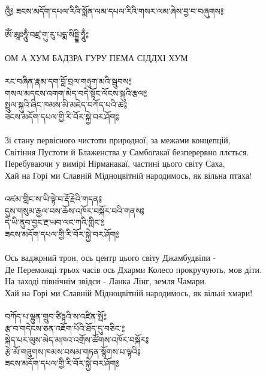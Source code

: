 \ru
\newpage
\ru
{}\\

{\ti འུྃ༔ ཟངས་མདོག་དཔལ་རིའི་སྨོན་ལམ་དཔལ་རིའི་གསར་ལམ་ཞེས་བྱ་བ་བཞུགས༔}\\
\\
{\ti ཨོཾ་ཨཱཿཧཱུྃ་བཛྲ་གུ་རུ་པདྨ་སིདྡྷི་ཧཱུྃ༔}\\
\\
ОМ А ХУМ БАДЗРА ГУРУ ПЕМА СІДДХІ ХУМ \\
\\
{\ti རང་བཞིན་རྣམ་དག་བློ་བྲལ་གཉུག་མའི་སྦུབས༔\\
གསལ་མདངས་འགག་མེད་བདེ་སྟོང་ལོངས་སྐུའི་རྩལ༔\\
སྤྲུལ་སྐུའི་ཞིང་ཁམས་མི་མཇེད་བཀོད་པའི་ཆ༔\\
ཟངས་མདོག་དཔལ་གྱི་རི་བོར་སྐྱེ་བར་ཤོག༔}\\
\\
Зі стану первісного чистоти природної, за межами концепцій,\\
Світіння Пустоти й Блаженства у Самбогакаї безперервно ллється.\\
Перебуваючи у вимірі Нірманакаї, частині цього світу Саха,\\
Хай на Горі ми Славній Мідноцвітній народимось, як вільна птаха!\\
\\
{\ti འཛམ་གླིང་ས་ཡི་ལྟེ་བ་རྡོ་རྗེའི་གདན༔\\
དུས་གསུམ་རྒྱལ་བས་ཆོས་འཁོར་བསྐོར་བའི་གནས༔\\
དེ་ཡི་ནུབ་བྱང་རྔ་ཡབ་ལང་ཀའི་གླིང་༔\\
ཟངས་མདོག་དཔལ་གྱི་རི་བོར་སྐྱེ་བར་ཤོག༔}\\
\\
Ось ваджрний трон, ось центр цього світу Джамбудвіпи -\\
Де Переможці трьох часів ось Дхарми Колесо прокручують, мов діти.\\
На заході північнім звідси - Ланка Лінг, земля Чамари.\\
Хай на Горі ми Славній Мідноцвітній народимось, як вільні хмари!\\
\\
{\ti བཀོད་པ་ལྷུན་གྲུབ་ཙིཏྟའི་ས་འཛིན་སྤོ༔\\
རྩ་བ་གདེངས་ཅན་འཇོག་པོའི་ཐོད་དུ་བཅིང་༔\\
སྐེད་པར་ལུས་མེད་མཁའ་འགྲོས་ཚོགས་འཁོར་བསྐོར༔\\
རྩེ་མོ་གཟུགས་ཁམས་བསམ་གཏན་སྙོགས་པ་ལྟའི༔\\
ཟངས་མདོག་དཔལ་གྱི་རི་བོར་སྐྱེ་བར་ཤོག༔}\\
